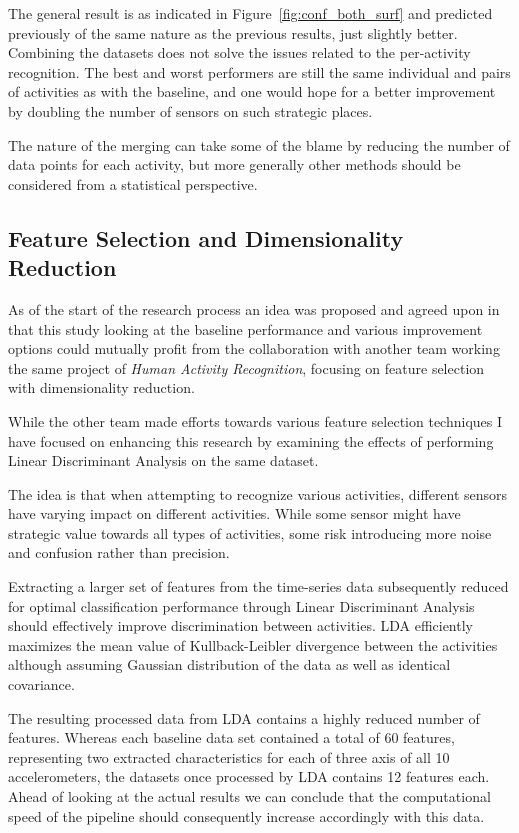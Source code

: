 \documentclass{sig-alternate}
\begin{document}
The general result is as indicated in Figure~\ref{fig:conf_both_surf} and predicted previously of the same nature as the previous results, just slightly better. Combining the datasets does not solve the issues related to the per-activity recognition. The best and worst performers are still the same individual and pairs of activities as with the baseline, and one would hope for a better improvement by doubling the number of sensors on such strategic places.

The nature of the merging can take some of the blame by reducing the number of data points for each activity, but more generally other methods should be considered from a statistical perspective.

\subsection{Feature Selection and Dimensionality Reduction}
As of the start of the research process an idea was proposed and agreed upon in that this study looking at the baseline performance and various improvement options could mutually profit from the collaboration with another team working the same project of \textit{Human Activity Recognition}, focusing on feature selection with dimensionality reduction.

While the other team made efforts towards various feature selection techniques I have focused on enhancing this research by examining the effects of performing Linear Discriminant Analysis on the same dataset.

The idea is that when attempting to recognize various activities, different sensors have varying impact on different activities. While some sensor might have strategic value towards all types of activities, some risk introducing more noise and confusion rather than precision.

Extracting a larger set of features from the time-series data subsequently reduced for optimal classification performance through Linear Discriminant Analysis should effectively improve discrimination between activities. LDA efficiently maximizes the mean value of Kullback-Leibler divergence between the activities although assuming Gaussian distribution of the data as well as identical covariance.

The resulting processed data from LDA contains a highly reduced number of features. Whereas each baseline data set contained a total of 60 features, representing two extracted characteristics for each of three axis of all 10 accelerometers, the datasets once processed by LDA contains 12 features each. Ahead of looking at the actual results we can conclude that the computational speed of the pipeline should consequently increase accordingly with this data.
\end{document}
